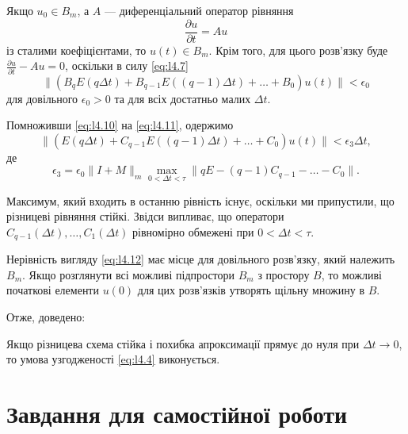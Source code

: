 Якщо $u_0 \in B_m$, а $A$ --- диференціальний оператор рівняння 
\begin{equation}
    \frac{\partial u}{\partial t} = A u
\end{equation}
із сталими коефіцієнтами, то $u(t) \in B_m$. Крім того, для цього розв'язку буде $\frac{\partial u}{\partial t} - A u = 0$, оскільки в силу \eqref{eq:l4.7} 
\begin{equation}
    \label{eq:l4.11}
    \| (B_q E (q \Delta t) + B_{q - 1} E ((q - 1) \Delta t) + \ldots + B_0) u(t) \| < \epsilon_0
\end{equation}
для довільного $\epsilon_0 > 0$ та для всіх достатньо малих $\Delta t$. \medskip

Помноживши \eqref{eq:l4.10} на \eqref{eq:l4.11}, одержимо
\begin{equation}
    \label{eq:l4.12}
    \| ( E (q \Delta t) + C_{q - 1} E ((q - 1) \Delta t) + \ldots + C_0 ) u(t) \| < \epsilon_3 \Delta t,
\end{equation}
де 
\begin{equation*}
    \epsilon_3 = \epsilon_0 \|I + M\|_m \max_{0 < \Delta t < \tau} \| q E - (q - 1) C_{q - 1} - \ldots - C_0 \|.
\end{equation*}

Максимум, який входить в останню рівність існує, оскільки ми припустили, що різницеві рівняння стійкі. Звідси випливає, що оператори $C_{q - 1}(\Delta t), \ldots, C_1(\Delta t)$  рівномірно обмежені при $0 < \Delta t < \tau$. \medskip

Нерівність вигляду \eqref{eq:l4.12} має місце для довільного розв'язку, який належить $B_m$. Якщо розглянути всі можливі підпростори $B_m$ з простору $B$, то можливі початкові елементи $u(0)$ для цих розв'язків утворять щільну множину в $B$. \medskip

Отже, доведено: 
\begin{theorem}
    Якщо різницева схема стійка і похибка апроксимації прямує до нуля при $\Delta t \to 0$, то умова узгодженості \eqref{eq:l4.4} виконується. 
\end{theorem}

\section{Завдання для самостійної роботи}

